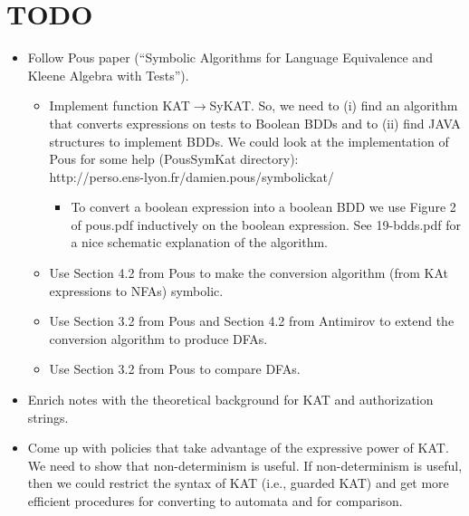 \documentclass[10pt]{article}
\begin{document}
\section*{TODO}
\begin{itemize}
\item Follow Pous paper (``Symbolic Algorithms for Language Equivalence and Kleene Algebra with Tests'').
\begin{itemize}
\item Implement function KAT$\rightarrow$SyKAT. So, we need to (i) find an algorithm that converts expressions on tests to Boolean BDDs and to (ii) find JAVA structures to implement BDDs. We could look at the implementation of Pous for some help (PousSymKat directory):\\
http://perso.ens-lyon.fr/damien.pous/symbolickat/
\begin{itemize}
\item To convert a boolean expression into a boolean BDD we use Figure 2 of pous.pdf inductively on the boolean expression. See 19-bdds.pdf for a nice schematic explanation of the algorithm.
\end{itemize}
\item Use Section 4.2 from Pous to make the conversion algorithm (from KAt expressions to NFAs) symbolic.
\item Use Section 3.2 from Pous and Section 4.2 from Antimirov to extend the conversion algorithm to produce DFAs.
\item Use Section 3.2 from Pous to compare DFAs.
\end{itemize}  
\item Enrich notes with the theoretical background for KAT and authorization strings.
\item Come up with policies that take advantage of the expressive power of KAT. We need to show that non-determinism is useful. If non-determinism is useful, then we could restrict the syntax of KAT (i.e., guarded KAT) and get more efficient procedures for converting to automata and for comparison.
\end{itemize}
\newpage
\end{document}
